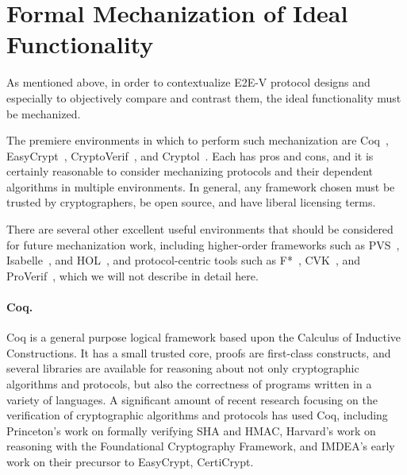 \section{Formal Mechanization of Ideal Functionality}
\label{sec:crypto_mechanization}

As mentioned above, in order to contextualize E2E-V protocol designs
and especially to objectively compare and contrast them, the ideal
functionality must be mechanized.

The premiere environments in which to perform such mechanization are
Coq~\cite{Coq}, EasyCrypt~\cite{EasyCrypt},
CryptoVerif~\cite{CryptoVerif}, and Cryptol~\cite{Cryptol}. Each has
pros and cons, and it is certainly reasonable to consider mechanizing
protocols and their dependent algorithms in multiple environments. In
general, any framework chosen must be trusted by cryptographers, be
open source, and have liberal licensing terms.

There are several other excellent useful environments that should be
considered for future mechanization work, including higher-order
frameworks such as PVS~\cite{PVS}, Isabelle~\cite{Isabelle}, and
HOL~\cite{HOL}, and protocol-centric tools such as F*~\cite{Fstar},
CVK~\cite{CVK}, and ProVerif~\cite{ProVerif}, which we will not
describe in detail here.

\paragraph{Coq.} Coq is a general purpose logical framework based upon
the Calculus of Inductive Constructions. It has a small trusted core,
proofs are first-class constructs, and several libraries are available
for reasoning about not only cryptographic algorithms and protocols,
but also the correctness of programs written in a variety of
languages. A significant amount of recent research focusing on the
verification of cryptographic algorithms and protocols has used Coq,
including Princeton's work on formally verifying SHA and HMAC,
Harvard's work on reasoning with the Foundational Cryptography
Framework, and IMDEA's early work on their precursor to EasyCrypt,
CertiCrypt.

